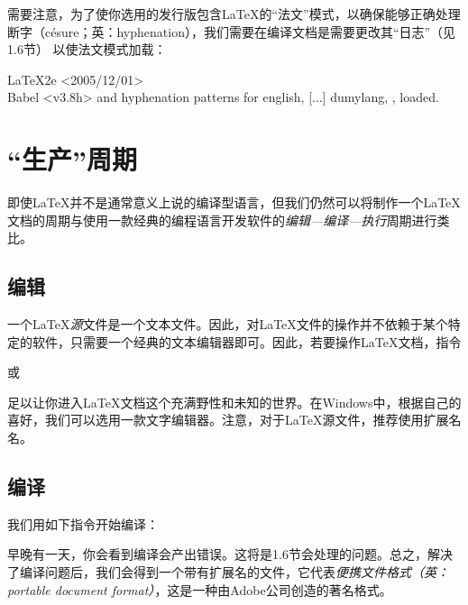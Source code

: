 \begin{exclamation}
    需要注意，为了使你选用的发行版包含\LaTeX 的“法文”模式，以确保能够正确处理断字（césure；英：hyphenation），我们需要在编译文档是需要更改其“日志”（见1.6节）%
    以使法文模式加载：

    \begin{dmd}
    LaTeX2e <2005/12/01>\\
    Babel <v3.8h> and hyphenation patterns for english, [...] dumylang, , loaded.
    \end{dmd}
\end{exclamation}

\section{“生产”周期}

即使\LaTeX 并不是通常意义上说的编译型语言，但我们仍然可以将制作一个\LaTeX 文档的周期与使用一款经典的编程语言开发软件的\textit{编辑—编译—执行}周期进行类比。

\subsection{编辑}

一个\LaTeX \textit{源}文件是一个文本文件。因此，对\LaTeX 文件的操作并不依赖于某个特定的软件，只需要一个经典的文本编辑器即可。因此，若要操作\LaTeX 文档，指令


或


足以让你进入\LaTeX 文档这个充满野性和未知的世界。在Windows中，根据自己的喜好，我们可以选用一款文字编辑器。注意，对于\LaTeX 源文件，推荐使用扩展名名。

\subsection{编译}

我们用如下指令开始编译：


早晚有一天，你会看到编译会产出错误。这将是1.6节会处理的问题。总之，解决了编译问题后，我们会得到一个带有扩展名的文件，它代表\textit{便携文件格式（英：portable document format）}，这是一种由Adobe公司创造的著名格式。

